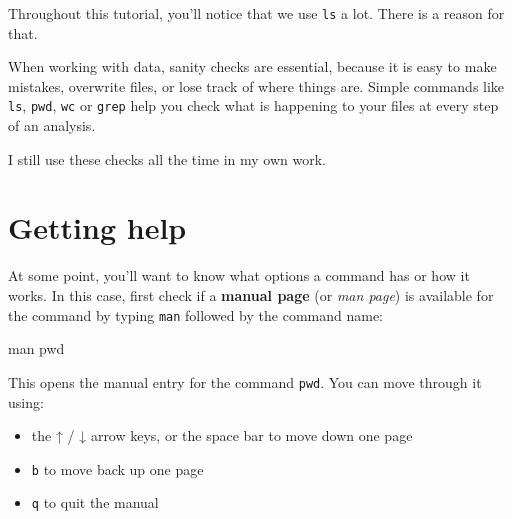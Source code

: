 \documentclass[
  letterpaper,
  DIV=11,
  numbers=noendperiod]{scrreprt}
\newenvironment{Shaded}{}{}
\newcommand{\FunctionTok}[1]{\textcolor[rgb]{0.44,0.26,0.76}{#1}}
\newcommand{\NormalTok}[1]{\textcolor[rgb]{0.14,0.16,0.18}{#1}}
\providecommand{\tightlist}{%
  \setlength{\itemsep}{0pt}\setlength{\parskip}{0pt}}
\begin{document}
\begin{tcolorbox}[enhanced jigsaw, coltitle=black, breakable, titlerule=0mm, colback=white, rightrule=.15mm, bottomrule=.15mm, toprule=.15mm, colframe=quarto-callout-tip-color-frame, colbacktitle=quarto-callout-tip-color!10!white, bottomtitle=1mm, opacitybacktitle=0.6, toptitle=1mm, leftrule=.75mm, arc=.35mm, title=\textcolor{quarto-callout-tip-color}{\faLightbulb}\hspace{0.5em}{Tip: Using ls in practice}, left=2mm, opacityback=0]

Throughout this tutorial, you'll notice that we use \texttt{ls} a lot.
There is a reason for that.

When working with data, sanity checks are essential, because it is easy
to make mistakes, overwrite files, or lose track of where things are.
Simple commands like \texttt{ls}, \texttt{pwd}, \texttt{wc} or
\texttt{grep} help you check what is happening to your files at every
step of an analysis.

I still use these checks all the time in my own work.

\end{tcolorbox}

\section{Getting help}\label{getting-help}

At some point, you'll want to know what options a command has or how it
works. In this case, first check if a \textbf{manual page} (or \emph{man
page}) is available for the command by typing \texttt{man} followed by
the command name:

\begin{Shaded}
\begin{Highlighting}[]
\FunctionTok{man}\NormalTok{ pwd}
\end{Highlighting}
\end{Shaded}

This opens the manual entry for the command \texttt{pwd}. You can move
through it using:

\begin{itemize}
\tightlist
\item
  the ↑ / ↓ arrow keys, or the space bar to move down one page
\item
  \texttt{b} to move back up one page
\item
  \texttt{q} to quit the manual
\end{itemize}
\end{document}

